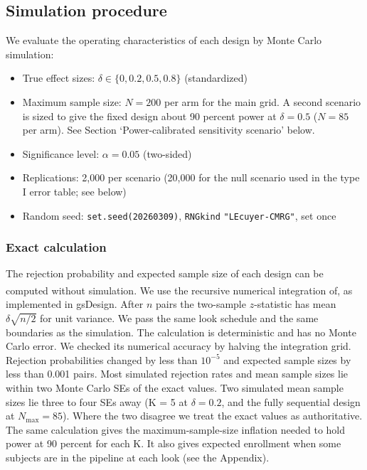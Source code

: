 \documentclass[
  11pt,
]{article}
\providecommand{\tightlist}{%
  \setlength{\itemsep}{0pt}\setlength{\parskip}{0pt}}
\begin{document}
\subsection{Simulation procedure}\label{simulation-procedure}

We evaluate the operating characteristics of each design
by Monte Carlo simulation:

\begin{itemize}
\tightlist
\item
  True effect sizes: \(\delta \in \{0, 0.2, 0.5, 0.8\}\)
  (standardized)
\item
  Maximum sample size: \(N = 200\) per arm for the
  main grid. A second scenario is sized to give the
  fixed design about 90 percent power at
  \(\delta = 0.5\) (\(N = 85\) per arm). See Section
  `Power-calibrated sensitivity scenario' below.
\item
  Significance level: \(\alpha = 0.05\) (two-sided)
\item
  Replications: 2,000 per scenario (20,000 for the
  null scenario used in the type I error table; see
  below)
\item
  Random seed: \texttt{set.seed(20260309)}, \texttt{RNGkind}
  \texttt{"L\textquotesingle{}Ecuyer-CMRG"}, set once
\end{itemize}

\subsubsection{Exact calculation}\label{exact-calculation}

The rejection probability and expected sample size of
each design can be computed without simulation. We use
the recursive numerical integration of\textsuperscript{}, as implemented in
gsDesign. After \(n\) pairs the two-sample \(z\)-statistic
has mean \(\delta\sqrt{n/2}\) for unit variance. We pass
the same look schedule and the same boundaries as the
simulation. The calculation is deterministic and has
no Monte Carlo error. We checked its numerical accuracy
by halving the integration grid. Rejection
probabilities changed by less than \(10^{-5}\) and
expected sample sizes by less than 0.001 pairs. Most
simulated rejection rates and mean sample sizes lie
within two Monte Carlo SEs of the exact values. Two
simulated mean sample sizes lie three to four SEs away
(K = 5 at \(\delta = 0.2\), and the fully sequential
design at \(N_{\max} = 85\)). Where the two disagree we
treat the exact values as authoritative. The same
calculation gives the maximum-sample-size inflation
needed to hold power at 90 percent for each K. It also
gives expected enrollment when some subjects are in the
pipeline at each look (see the Appendix).
\end{document}
